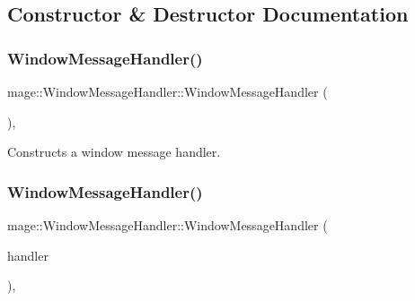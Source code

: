 \subsection{Constructor \& Destructor Documentation}
\hypertarget{classmage_1_1_window_message_handler_ae2213e3ff0a7c418ecfed87cfa43a8b7}{}\label{classmage_1_1_window_message_handler_ae2213e3ff0a7c418ecfed87cfa43a8b7} 
\subsubsection{\texorpdfstring{Window\+Message\+Handler()}{WindowMessageHandler()}\hspace{0.1cm}{\footnotesize\ttfamily [1/3]}}
{\footnotesize\ttfamily mage\+::\+Window\+Message\+Handler\+::\+Window\+Message\+Handler (\begin{DoxyParamCaption}{ }\end{DoxyParamCaption})\hspace{0.3cm}{\ttfamily [default]}, {\ttfamily [noexcept]}}

Constructs a window message handler. \hypertarget{classmage_1_1_window_message_handler_a2dd683eafde6c68efc55aebc8460fb0a}{}\label{classmage_1_1_window_message_handler_a2dd683eafde6c68efc55aebc8460fb0a} 
\subsubsection{\texorpdfstring{Window\+Message\+Handler()}{WindowMessageHandler()}\hspace{0.1cm}{\footnotesize\ttfamily [2/3]}}
{\footnotesize\ttfamily mage\+::\+Window\+Message\+Handler\+::\+Window\+Message\+Handler (\begin{DoxyParamCaption}\item[{const \hyperlink{classmage_1_1_window_message_handler}{Window\+Message\+Handler} \&}]{handler }\end{DoxyParamCaption})\hspace{0.3cm}{\ttfamily [default]}, {\ttfamily [noexcept]}}

